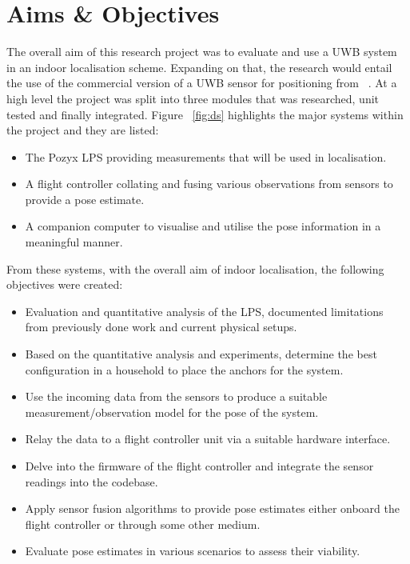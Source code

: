 \section{Aims \& Objectives}\label{sec:aims_objs}
The overall aim of this research project was to evaluate and use a UWB system in an indoor localisation scheme.
Expanding on that, the research would entail the use of the commercial version of a UWB sensor for positioning from ~\cite{pozyx2018pozyx}.
At a high level the project was split into three modules that was researched, unit tested and finally integrated.
Figure ~\ref{fig:ds} highlights the major systems within the project and they are listed:
\begin{itemize}
    \item The Pozyx LPS providing measurements that will be used in localisation.
    \item A flight controller collating and fusing various observations from sensors to provide a pose estimate.
    \item A companion computer to visualise and utilise the pose information in a meaningful manner.
\end{itemize}

From these systems, with the overall aim of indoor localisation, the following objectives were created:
\begin{itemize}
    \item Evaluation and quantitative analysis of the LPS, documented limitations from previously done work and current physical setups.
    \item Based on the quantitative analysis and experiments, determine the best configuration in a household to place the anchors for the system.
    \item Use the incoming data from the sensors to produce a suitable measurement/observation model for the pose of the system.
    \item Relay the data to a flight controller unit via a suitable hardware interface.
    \item Delve into the firmware of the flight controller and integrate the sensor readings into the codebase.
    \item Apply sensor fusion algorithms to provide pose estimates either onboard the flight controller or through some other medium.
    \item Evaluate pose estimates in various scenarios to assess their viability.
\end{itemize}

